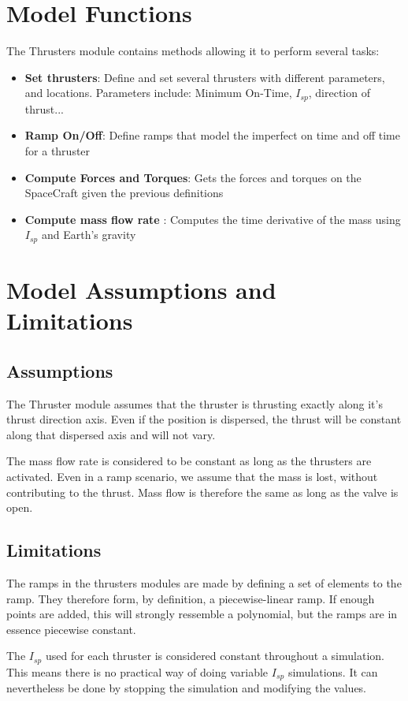 \section{Model Functions}

The Thrusters module contains methods allowing it to perform several tasks:

\begin{itemize}
	\item \textbf{Set thrusters}: Define and set several thrusters with different parameters, and locations. Parameters include: Minimum On-Time, $I_{sp}$, direction of thrust...
	\item \textbf{Ramp On/Off}: Define ramps that model the imperfect on time and off time for a thruster
	\item \textbf{Compute Forces and Torques}: Gets the forces and torques on the SpaceCraft given the previous definitions
	\item \textbf{Compute mass flow rate }: Computes the time derivative of the mass using $I_{sp}$ and Earth's gravity
\end{itemize}




\section{Model Assumptions and Limitations}

\subsection{Assumptions}

The Thruster module assumes that the thruster is thrusting exactly along it's thrust direction axis. Even if the position is dispersed, the thrust will be constant along that dispersed axis and will not vary.

The mass flow rate is considered to be constant as long as the thrusters are activated. Even in a ramp scenario, we assume that the mass is lost, without contributing to the thrust. Mass flow is therefore the same as long as the valve is open. 

\subsection{Limitations}

The ramps in the thrusters modules are made by defining a set of elements to the ramp. They therefore form, by definition, a piecewise-linear ramp. If enough points are added, this will strongly ressemble a polynomial, but the ramps are in essence piecewise constant.

The $I_{sp}$ used for each thruster is considered constant throughout a simulation. This means there is no practical way of doing variable $I_{sp}$ simulations. It can nevertheless be done by stopping the simulation and modifying the values.

